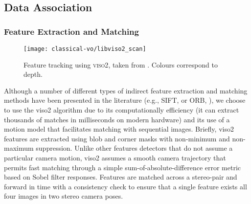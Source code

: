 \subsection{Data Association}
\label{sec:vo_data_extraction}
\subsubsection{Feature Extraction and Matching}
 
\begin{figure}[h!]
\begin{center}
		\texttt{[image: classical-vo/libviso2\_scan]}
		\caption{Feature tracking using \textsc{viso2}, taken from \cite{Geiger2011-xe}. Colours correspond to depth.}
  	\label{fig:vo_feature_tracking}
\end{center}
\end{figure}
Although a number of different types of indirect feature extraction and matching methods have been presented in the literature (e.g., \textsf{SIFT}, \cite{lowe_object_1999} or \textsf{ORB}, \cite{rublee2011orb}), we choose to use the \textsf{viso2} \citep{Geiger2011-xe} algorithm due to its computationally efficiency (it can extract thousands of matches in milliseconds on modern hardware) and its use of a motion model that facilitates matching with sequential images. Briefly, \textsf{viso2} features are extracted using blob and corner masks with non-minimum and non-maximum suppression. Unlike other features detectors that do not assume a particular camera motion, \textsf{viso2} assumes a smooth camera trajectory that permits fast matching through a simple sum-of-absolute-difference error metric based on Sobel filter responses. Features are matched across a stereo-pair and forward in time with a consistency check to ensure that a single feature exists all four images in two stereo camera poses. 
